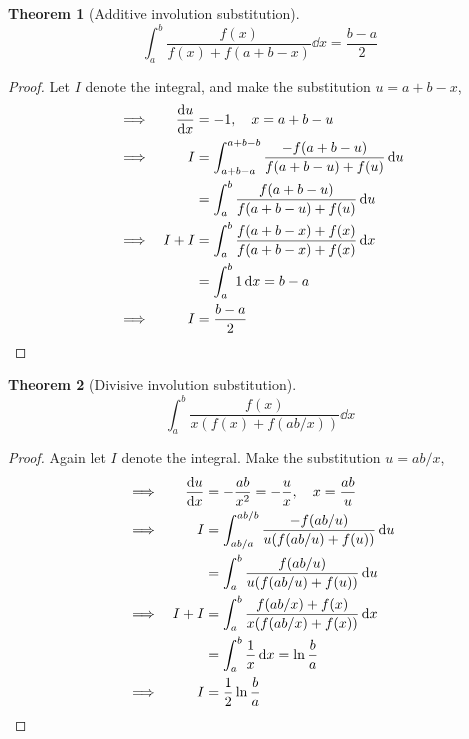 \documentclass[fleqn,a4paper,11pt]{article}
\newtheorem{theorem}{Theorem}[section]
\begin{document}
    \begin{theorem}[Additive involution substitution]
    \begin{equation*}
    \int_a^b \frac{f(x)}{f(x) + f(a + b - x)} \dd{x} = \frac{b - a} 2
    \end{equation*}
    \end{theorem}
    \begin{proof}
    Let \(I\) denote the integral, and make the substitution \(u = a + b - x\),
    \begin{alignat*}{2}
    &\implies& \dv{u}{x} &= -1, \quad x = a + b - u \\
    &\implies& I &= \int_{a + b - a}^{a + b - b}
                        \frac{-f(a + b - u)}{f(a + b - u) + f(u)} \dd{u} \\
    &&  &= \int_a^b \frac{f(a + b - u)}{f(a + b - u) + f(u)} \dd{u} \\
    &\implies& I + I &= \int_a^b
                        \frac{f(a + b - x) + f(x)}
                             {f(a + b - x) + f(x)} \dd{x} \\
    &&  &= \int_a^b 1 \dd{x} = b - a \\
    &\implies& I &= \frac{b - a} 2 \qedhere
    \end{alignat*}
    \end{proof}
    \begin{theorem}[Divisive involution substitution]
    \begin{equation*}
    \int_a^b \frac{f(x)}{x(f(x) + f(ab / x))} \dd{x}
    \end{equation*}
    \end{theorem}
    \begin{proof}
    Again let \(I\) denote the integral. Make the substitution \(u = ab / x\),
    \begin{alignat*}{2}
    &\implies& \dv{u}{x} &= -\frac{ab}{x^2} = -\frac ux, \quad x = \frac{ab}u \\
    &\implies& I &= \int_{ab/a}^{ab/b} \frac{-f(ab / u)}{u(f(ab / u) + f(u))}
        \dd{u} \\
    && &= \int_a^b \frac{f(ab / u)}{u(f(ab / u) + f(u))} \dd{u} \\
    &\implies& I + I &= \int_a^b \frac{f(ab / x) + f(x)}
                                      {x(f(ab / x) + f(x))} \dd{x} \\
    && &= \int_a^b \frac 1x \dd{x} = \ln \frac ba \\
    &\implies& I &= \frac 12 \ln \frac ba \qedhere
    \end{alignat*}
    \end{proof}
\end{document}
